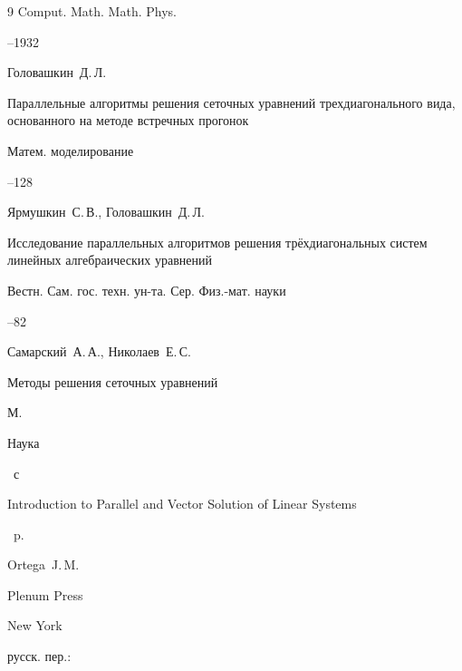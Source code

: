 \begin{thebibliography}{9}
\jour  Comput. Math. Math. Phys. 




--1932






\by Головашкин~Д.\,Л.

\paper Параллельные алгоритмы решения сеточных уравнений трехдиагонального вида, основанного на методе встречных прогонок

\jour  Матем. моделирование




--128






\by Ярмушкин~С.\,В., Головашкин~Д.\,Л.

\paper Исследование параллельных алгоритмов решения трёхдиагональных систем линейных алгебраических уравнений

\jour Вестн. Сам. гос. техн. ун-та. Сер. Физ.-мат. науки



--82




\by Самарский~А.\,А., Николаев~Е.\,С.

\book Методы решения сеточных уравнений

\publaddr М. 

\publ Наука


~с




\book Introduction to Parallel and Vector Solution of Linear Systems

~p.  


\by Ortega~J.\,M.	

\publ Plenum Press

\publaddr New York

\rtransl

русск. пер.:


\end{thebibliography}
